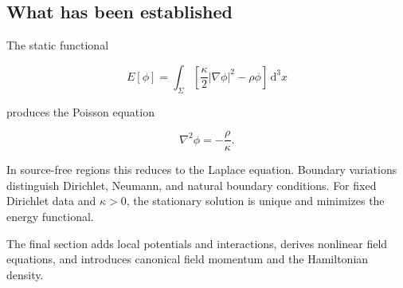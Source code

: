 \subsection{What has been established}

The static functional

\[
E[\phi]
=
\int_{\Sigma}
\left[
\frac{\kappa}{2}|\nabla\phi|^{2}
-
\rho\phi
\right]
\,\mathrm{d}^{3}x
\]

produces the Poisson equation

\[
\nabla^{2}\phi=-\frac{\rho}{\kappa}.
\]

In source-free regions this reduces to the Laplace equation. Boundary variations distinguish Dirichlet, Neumann, and natural boundary conditions. For fixed Dirichlet data and \(\kappa>0\), the stationary solution is unique and minimizes the energy functional.

The final section adds local potentials and interactions, derives nonlinear field equations, and introduces canonical field momentum and the Hamiltonian density.